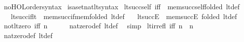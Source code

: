 \begin{isabellebody}
\isanewline
\isanewline
{}\isamarkupfalse%
\ no{\isacharunderscore}{\kern0pt}HOL{\isacharunderscore}{\kern0pt}order{\isacharunderscore}{\kern0pt}syntax\isanewline
{}\isamarkupfalse%
\ isa{\isacharunderscore}{\kern0pt}set{\isacharunderscore}{\kern0pt}nat{\isacharunderscore}{\kern0pt}lt{\isacharunderscore}{\kern0pt}syntax\isanewline
\isanewline
{}\isamarkupfalse%
\ lt{\isacharunderscore}{\kern0pt}succ{\isacharunderscore}{\kern0pt}self\ {\isacharbrackleft}{\kern0pt}iff{\isacharbrackright}{\kern0pt}\ {\isacharequal}{\kern0pt}\ mem{\isacharunderscore}{\kern0pt}succ{\isacharunderscore}{\kern0pt}self{\isacharbrackleft}{\kern0pt}folded\ lt{\isacharunderscore}{\kern0pt}def{\isacharbrackright}{\kern0pt}\isanewline
\ \ \ lt{\isacharunderscore}{\kern0pt}succ{\isacharunderscore}{\kern0pt}if{\isacharunderscore}{\kern0pt}lt\ {\isacharequal}{\kern0pt}\ mem{\isacharunderscore}{\kern0pt}succ{\isacharunderscore}{\kern0pt}if{\isacharunderscore}{\kern0pt}mem{\isacharbrackleft}{\kern0pt}folded\ lt{\isacharunderscore}{\kern0pt}def{\isacharbrackright}{\kern0pt}\isanewline
\ \ \ lt{\isacharunderscore}{\kern0pt}succE\ {\isacharequal}{\kern0pt}\ mem{\isacharunderscore}{\kern0pt}succE\ {\isacharbrackleft}{\kern0pt}folded\ lt{\isacharunderscore}{\kern0pt}def{\isacharbrackright}{\kern0pt}\isanewline
\isanewline
{}\isamarkupfalse%
\ not{\isacharunderscore}{\kern0pt}lt{\isacharunderscore}{\kern0pt}zero\ {\isacharbrackleft}{\kern0pt}iff{\isacharbrackright}{\kern0pt}{\isacharcolon}{\kern0pt}\ {\isachardoublequoteopen}{\isasymnot}{\isacharparenleft}{\kern0pt}n\ {\isacharless}{\kern0pt}\ {}{\isacharparenright}{\kern0pt}{\isachardoublequoteclose}\isanewline
%
\isadelimproof
\ \ %
\endisadelimproof
%
\isatagproof
{}\isamarkupfalse%
\ nat{\isacharunderscore}{\kern0pt}zero{\isacharunderscore}{\kern0pt}def\ lt{\isacharunderscore}{\kern0pt}def\ \isamarkupfalse%
\ simp%
\endisatagproof
{\isafoldproof}%
%
\isadelimproof
\isanewline
%
\endisadelimproof
\isanewline
{}\isamarkupfalse%
\ lt{\isacharunderscore}{\kern0pt}irrefl\ {\isacharbrackleft}{\kern0pt}iff{\isacharbrackright}{\kern0pt}{\isacharcolon}{\kern0pt}\ {\isachardoublequoteopen}{\isasymnot}{\isacharparenleft}{\kern0pt}n\ {\isacharless}{\kern0pt}\ n{\isacharparenright}{\kern0pt}{\isachardoublequoteclose}\isanewline
%
\isadelimproof
\ \ %
\endisadelimproof
%
\isatagproof
{}\isamarkupfalse%
\ nat{\isacharunderscore}{\kern0pt}zero{\isacharunderscore}{\kern0pt}def\ lt{\isacharunderscore}{\kern0pt}def\ \isamarkupfalse%

\end{isabellebody}
